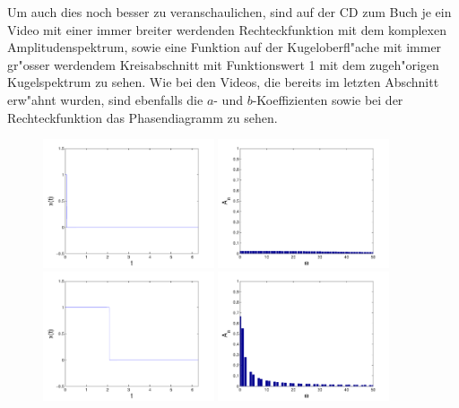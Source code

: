 \begin{refsection}
Um auch dies noch besser zu veranschaulichen, sind auf der CD zum Buch 
je ein Video mit einer immer breiter werdenden Rechteckfunktion mit dem 
komplexen Amplitudenspektrum, sowie eine Funktion auf der 
Kugeloberfl"ache mit immer gr"osser werdendem Kreisabschnitt mit 
Funktionswert 1 mit dem zugeh"origen Kugelspektrum zu sehen. 
Wie bei den Videos, die bereits im letzten Abschnitt erw"ahnt wurden, 
sind ebenfalls die $a$- und $b$-Koeffizienten sowie bei der 
Rechteckfunktion das Phasendiagramm zu sehen.
\begin{figure}
\centering
\includegraphics[width=0.45\textwidth]{kugel/Dkonstant/Rechteck1_1.pdf}
\includegraphics[width=0.45\textwidth]{kugel/Dkonstant/Rechteck1_2.pdf}
\includegraphics[width=0.45\textwidth]{kugel/Dkonstant/Rechteck2_1.pdf}
\includegraphics[width=0.45\textwidth]{kugel/Dkonstant/Rechteck2_2.pdf}

\end{figure}
\end{refsection}
